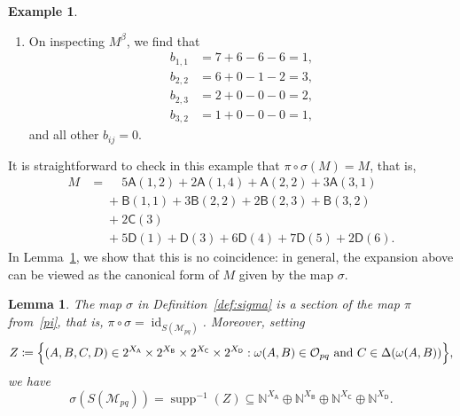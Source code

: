 \documentclass[noamsfonts,10pt]{amsart}
\newcommand{\N}{\mathbb{N}}
\newcommand{\M}{\mathcal{M}}
\newcommand{\be}{\beta}
\renewcommand{\O}{\mathcal{O}}
\DeclareMathOperator{\supp}{supp}
\newcommand{\sA}{\mathsf{A}}
\newcommand{\sB}{\mathsf{B}}
\newcommand{\sC}{\mathsf{C}}
\newcommand{\sD}{\mathsf{D}}
\newcommand{\1}{\mathbf{1}}
\theoremstyle{plain}
\newtheorem{lemma}[theorem]{Lemma}
\theoremstyle{definition}
\newtheorem{example}[theorem]{Example}
\numberwithin{equation}{section}
\begin{document}
\begin{example}
\begin{enumerate}
        \item On inspecting $M^\be$, we find that
        \begin{align*}
            b_{1,1} &= 7 + 6 - 6 - 6 = 1, \\
            b_{2,2} &= 6 + 0 - 1 - 2 = 3, \\
            b_{2,3} &= 2 + 0 - 0 - 0 = 2, \\
            b_{3,2} &= 1 + 0 - 0 - 0 = 1,
        \end{align*}
        and all other $b_{ij} = 0$.
    \end{enumerate}
    It is straightforward to check in this example that $\pi \circ \sigma(M) = M$, that is,
    \begin{align*}
        M &= \phantom{+} 5 \sA(1,2) + 2 \sA(1,4) + \sA(2,2) + 3 \sA(3,1) \\
        & \phantom{=} + \sB(1,1) + 3 \sB(2,2) + 2 \sB(2,3) + \sB(3,2) \\
        & \phantom{=} + 2 \sC(3) \\
        & \phantom{=} + 5 \sD(1) + \sD(3) + 6 \sD(4) + 7 \sD(5) + 2 \sD(6).
    \end{align*}
    In Lemma~\ref{lemma:Z}, we show that this is no coincidence:
    in general, the expansion above can be viewed as the canonical form of $M$ given by the map $\sigma$.
\end{example}

\begin{lemma}
    \label{lemma:Z}
    The map $\sigma$ in Definition~\ref{def:sigma} is a section of the map $\pi$ from~\eqref{pi}, that is, $\pi \circ \sigma = \operatorname{id}_{S(\M_{pq})}$.
    Moreover, setting
    \[
        Z \coloneqq \Big\{ (A,B,C,D) \in 2^{X_{\sA}} \times 2^{X_{\sB}} \times 2^{X_{\sC}} \times 2^{X_{\sD}} : \omega(A,B) \in \O_{pq} \textup{ and } C \in \Delta(\omega(A,B)) \Big\},
    \]
    we have
    \[
        \sigma(S(\M_{pq})) = \supp^{-1}(Z) \subseteq \N^{X_{\sA}} \oplus \N^{X_{\sB}} \oplus \N^{X_{\sC}} \oplus \N^{X_{\sD}}. 
    \]
\end{lemma}
\end{document}
